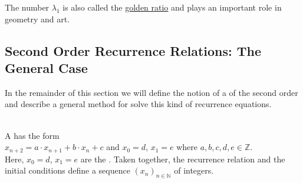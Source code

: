 \remark 
The number $\lambda_1$ is also called the \href{https://en.wikipedia.org/wiki/Golden_ratio}{golden ratio} 
and plays an important role in geometry and art. \eoxs

\subsection{Second Order Recurrence Relations: The General Case}
In the remainder of this section we will define the notion of a 
of the second order and describe a general method for solve this kind of recurrence equations.

\begin{Definition} \hspace*{\fill} \\
  A 
  has the form
  \\[0.2cm]
  \hspace*{1.3cm}
  $x_{n+2} = a \cdot x_{n+1} + b \cdot x_n + c$ \quad and \quad $x_0 = d$, $x_1 = e$
  \quad where $a, b, c, d, e \in \mathbb{Z}$.
  \\[0.2cm]
  Here, $x_0 = d$, $x_1 = e$ are the .  Taken together, the recurrence
  relation and the initial conditions define a sequence $(x_n)_{n\in\mathbb{N}}$ of integers.  \eox
\end{Definition}

